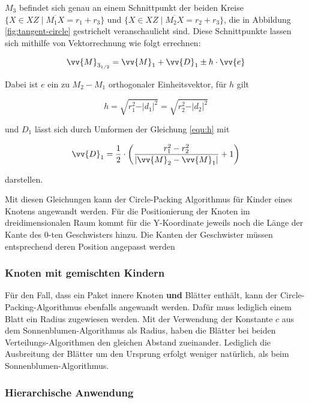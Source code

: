 $M_3$ befindet sich genau an einem Schnittpunkt der beiden Kreise $\lbrace X \in XZ \mid \overline{M_1 X} = r_1 + r_3 \rbrace$ und $\lbrace X \in XZ \mid \overline{M_2 X} = r_2 + r_3 \rbrace$, die in Abbildung \ref{fig:tangent-circle} gestrichelt veranschaulicht sind. Diese Schnittpunkte lassen sich mithilfe von Vektorrechnung wie folgt errechnen:

\begin{equation}
  \vv{M}_{3_{1/2}} = \vv{M}_1 + \vv{D}_{1} \pm h \cdot \vv{e}
\end{equation}

Dabei ist $e$ ein zu $M_2 - M_1$ orthogonaler Einheitsvektor, für $h$ gilt

\begin{equation}
\label{equ:h}
  h = \sqrt{r_1^2 - \vert d_1 \vert^2} = \sqrt{r_2^2 - \vert d_2 \vert^2}
\end{equation}

und $D_1$ lässt sich durch Umformen der Gleichung \ref{equ:h} mit

\begin{equation}
  \vv{D}_1 = \frac{1}{2} \cdot \left( \frac{r_1^2 - r_2^2}{\vert \vv{M}_2 - \vv{M}_1 \vert} + 1 \right)
\end{equation}

darstellen.

Mit diesen Gleichungen kann der Circle-Packing Algorithmus für Kinder eines Knotens angewandt werden. Für die Positionierung der Knoten im dreidimensionalen Raum kommt für die Y-Koordinate jeweils noch die Länge der Kante des $0$-ten Geschwisters hinzu. Die Kanten der Geschwister müssen entsprechend deren Position angepasst werden

\subsubsection*{Knoten mit gemischten Kindern}

Für den Fall, dass ein Paket innere Knoten \textbf{und} Blätter enthält, kann der Circle-Packing-Algorithmus ebenfalls angewandt werden. Dafür muss lediglich einem Blatt ein Radius zugewiesen werden. Mit der Verwendung der Konstante $c$ aus dem Sonnenblumen-Algorithmus als Radius, haben die Blätter bei beiden Verteilungs-Algorithmen den gleichen Abstand zueinander. Lediglich die Ausbreitung der Blätter um den Ursprung erfolgt weniger natürlich, als beim Sonnenblumen-Algorithmus.

\subsubsection*{Hierarchische Anwendung}

